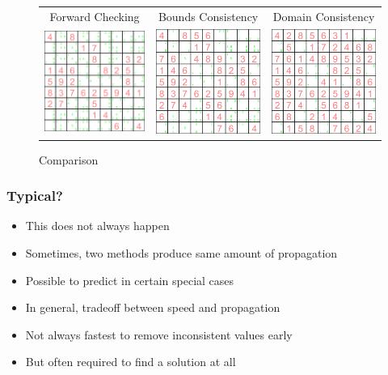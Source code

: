 \begin{figure}[ht]
\caption{\label{sudoku:comparison}Comparison}
\begin{center}
\begin{tabular}{ccc}
Forward Checking & Bounds Consistency & Domain Consistency \\
\includegraphics[width=4cm]{../sudoku/FC/frame29}
&
\includegraphics[width=4cm]{../sudoku/BC/frame29}
&
\includegraphics[width=4cm]{../sudoku/DC/frame29}
\end{tabular}
\end{center}
\end{figure}

\begin{frame}
\frametitle{Typical?}
\begin{itemize}
\item This does not always happen
\item Sometimes, two methods produce same amount of propagation
\item Possible to predict in certain special cases
\item In general, tradeoff between speed and propagation
\item Not always fastest to remove inconsistent values early
\item But often required to find a solution at all
\end{itemize}
\end{frame}

